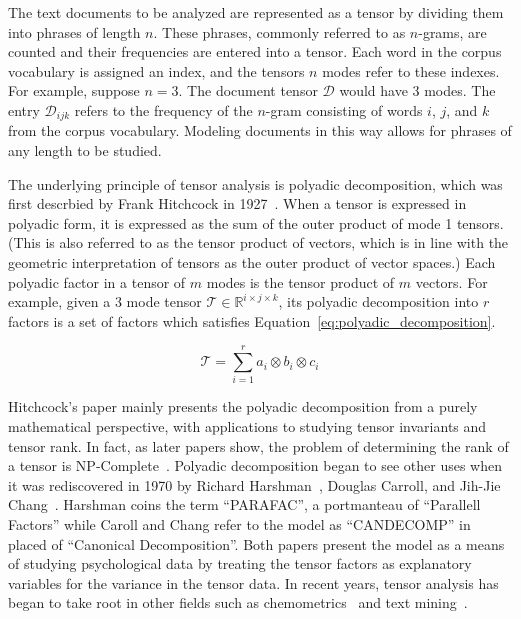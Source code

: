 \documentclass[../dissertation.tex]{subfiles}
\begin{document}
The text documents to be analyzed are represented as a tensor by
dividing them into phrases of length $n$.  These phrases, commonly
referred to as $n$-grams, are counted and their frequencies are
entered into a tensor.  Each word in the corpus vocabulary is assigned
an index, and the tensors $n$ modes refer to these indexes.  For
example, suppose $n=3$.  The document tensor $\mathcal{D}$ would have
3 modes.  The entry $\mathcal{D}_{ijk}$ refers to the frequency of the
$n$-gram consisting of words $i$, $j$, and $k$ from the corpus
vocabulary.  Modeling documents in this way allows for phrases of any
length to be studied.

The underlying principle of tensor analysis is polyadic decomposition,
which was first descrbied by Frank Hitchcock in
1927~\cite{hitchcock1927}.  When a tensor is expressed in polyadic
form, it is expressed as the sum of the outer product of mode 1
tensors.  (This is also referred to as the tensor product of vectors,
which is in line with the geometric interpretation of tensors as the
outer product of vector spaces.)  Each polyadic factor in a tensor of
$m$ modes is the tensor product of $m$ vectors.  For example, given a
3 mode tensor $\mathcal{T} \in \mathbb{R}^{i\times j \times k}$, its
polyadic decomposition into $r$ factors is a set of factors which
satisfies Equation~\ref{eq:polyadic_decomposition}.

\begin{equation} \label{eq:polyadic_decompositon}
  \mathcal{T} = \displaystyle\sum_{i=1}^{r} a_i \otimes b_i \otimes c_i
\end{equation}

Hitchcock's paper mainly presents the polyadic decomposition from a
purely mathematical perspective, with applications to studying tensor
invariants and tensor rank.  In fact, as later papers show, the
problem of determining the rank of a tensor is
NP-Complete~\cite{haastad1990}.  Polyadic decomposition began to see
other uses when it was rediscovered in 1970 by Richard
Harshman~\cite{harshman1970}, Douglas Carroll, and Jih-Jie
Chang~\cite{carroll1970}.   Harshman coins the term ``PARAFAC'', a
portmanteau of ``Parallell Factors'' while Caroll and Chang refer to
the model as ``CANDECOMP'' in placed of ``Canonical Decomposition''.
Both papers present the model as a means of studying psychological
data by treating the tensor factors as explanatory variables for the
variance in the tensor data.  In recent years, tensor analysis has
began to take root in other fields such as chemometrics~\cite{bro1997}
and text mining~\cite{bader2007}.  
\end{document}
